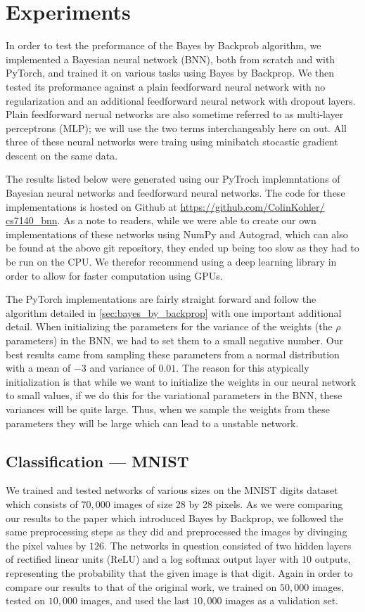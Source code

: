 \documentclass[11pt]{article}
\begin{document}
\section{Experiments}

In order to test the preformance of the Bayes by Backprob algorithm, we
implemented a Bayesian neural network (BNN), both from scratch and with PyTorch,
and trained it on various tasks using Bayes by Backprop. We then tested its
preformance against a plain feedforward neural network with no regularization
and an additional feedforward neural network with dropout layers. Plain 
feedforward nerual networks are also sometime referred to as multi-layer
perceptrons (MLP); we will use the two terms interchangeably here on out.
All three of these neural networks were traing using minibatch stocastic 
gradient descent on the same data.

The results listed below were generated using our PyTroch implemntations of 
Bayesian neural networks and feedforward neural networks. The code for these
implementations is hosted on Github at \url{https://github.com/ColinKohler/
cs7140_bnn}. As a note to readers, while we were able to create our own 
implementations of these networks using NumPy and Autograd, which can also
be found at the above git repository, they ended up being too slow as they had
to be run on the CPU\@. We therefor recommend using a deep learning library in
order to allow for faster computation using GPUs. 

The PyTorch implementations are fairly straight forward and follow the 
algorithm detailed in \cref{sec:bayes_by_backprop} with one important 
additional detail. When initializing the parameters for the variance of the 
weights (the $\rho$ parameters) in the BNN, we had to set them to a small
negative number. Our best results came from sampling these parameters from
a normal distribution with a mean of $-3$ and variance of $0.01$. The reason
for this atypically initialization is that while we want to initialize the
weights in our neural network to small values, if we do this for the 
variational parameters in the BNN, these variances will be quite large. Thus,
when we sample the weights from these parameters they will be large which can
lead to a unstable network.

\subsection{Classification --- MNIST}

We trained and tested networks of various sizes on the MNIST digits
dataset~\cite{mnist} which consists of $70,000$ images of size 28 by 28 pixels.
As we were comparing our results to the paper which introduced Bayes by
Backprop, we followed the same preprocessing steps as they did and preprocessed
the images by divinging the pixel values by $126$.  The networks in question
consisted of two hidden layers of rectified linear units (ReLU) and a log
softmax output layer with $10$ outputs, representing the probability that the
given image is that digit. Again in order to compare our results to that of the
original work, we trained on $50,000$ images, tested on $10,000$ images, and
used the last $10,000$ images as a validation set.
\end{document}
